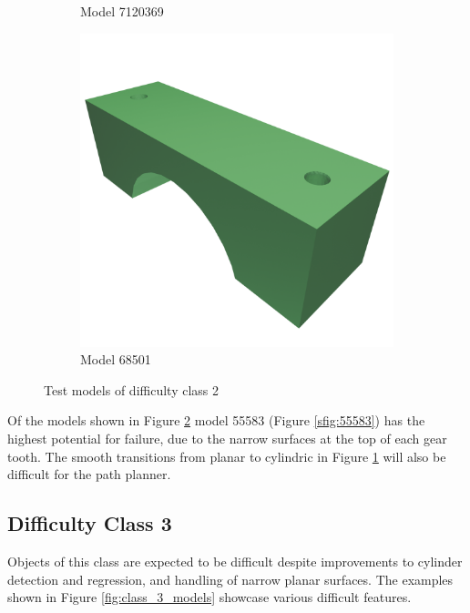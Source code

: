 \begin{figure}[htb]
\begin{subfigure}{0.3\textwidth}
	\caption{Model 7120369}
	\label{sfig:7120369}
\end{subfigure}
\hfill
\begin{subfigure}{0.3\textwidth}
	\includegraphics[width=\textwidth]{../resources/models/68501.png}
	\caption{Model 68501}
\end{subfigure}
\caption{Test models of difficulty class 2}
\label{fig:class_2_models}
\end{figure}

Of the models shown in Figure \ref{fig:class_2_models} model 55583 (Figure \ref{sfig:55583}) has the highest potential for failure, due to the narrow surfaces at the top of each gear tooth.
The smooth transitions from planar to cylindric in Figure \ref{sfig:7120369} will also be difficult for the path planner.

\subsection{Difficulty Class 3}
Objects of this class are expected to be difficult despite improvements to cylinder detection and regression, and handling of narrow planar surfaces.
The examples shown in Figure \ref{fig:class_3_models} showcase various difficult features.

